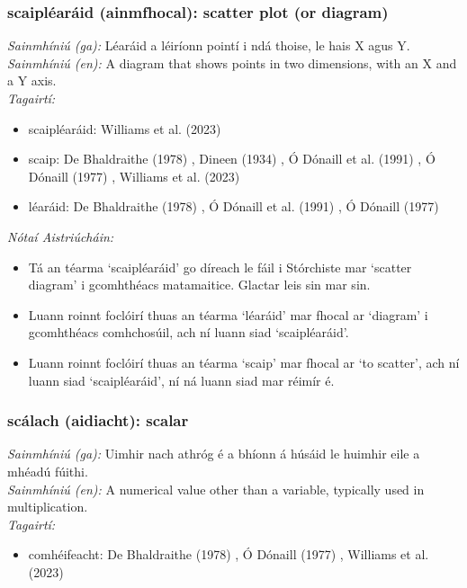 \subsubsection*{scaipléaráid (ainmfhocal): scatter plot (or diagram)}
 \noindent \textit{Sainmhíniú (ga):} Léaráid a léiríonn pointí i ndá thoise, le hais X agus Y.
\\
 \noindent \textit{Sainmhíniú (en):} A diagram that shows points in two dimensions, with an X and a Y axis.
\\
 \noindent \textit{Tagairtí:}
\begin{itemize}
	\item scaipléaráid: Williams et al. (2023) \cite{storchiste}
	\item scaip: De Bhaldraithe (1978) \cite{de-bhaldraithe}, Dineen (1934) \cite{dineen}, Ó Dónaill et al. (1991) \cite{focloir-beag}, Ó Dónaill (1977) \cite{odonaill}, Williams et al. (2023) \cite{storchiste}
	\item léaráid: De Bhaldraithe (1978) \cite{de-bhaldraithe}, Ó Dónaill et al. (1991) \cite{focloir-beag}, Ó Dónaill (1977) \cite{odonaill}
\end{itemize}

 \noindent \textit{Nótaí Aistriúcháin:}
\begin{itemize}
	\item Tá an téarma `scaipléaráid' go díreach le fáil i Stórchiste mar `scatter diagram' i gcomhthéacs matamaitice. Glactar leis sin mar sin.
	\item Luann roinnt foclóirí thuas an téarma `léaráid' mar fhocal ar `diagram' i gcomhthéacs comhchosúil, ach ní luann siad `scaipléaráid'.
	\item Luann roinnt foclóirí thuas an téarma `scaip' mar fhocal ar `to scatter', ach ní luann siad `scaipléaráid', ní ná luann siad mar réimír é.
\end{itemize}


\subsubsection*{scálach (aidiacht): scalar}
 \noindent \textit{Sainmhíniú (ga):} Uimhir nach athróg é a bhíonn á húsáid le huimhir eile a mhéadú fúithi.
\\
 \noindent \textit{Sainmhíniú (en):} A numerical value other than a variable, typically used in multiplication.
\\
 \noindent \textit{Tagairtí:}
\begin{itemize}
	\item comhéifeacht: De Bhaldraithe (1978) \cite{de-bhaldraithe}, Ó Dónaill (1977) \cite{odonaill}, Williams et al. (2023) \cite{storchiste}
\end{itemize}

